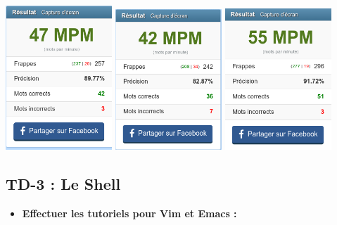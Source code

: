 \documentclass[12pt]{article}
\begin{document}
\thispagestyle{empty}
\begin{center}
  \includegraphics[width=4cm]{images/screen-resultat-1.png}\hfill
  \includegraphics[width=4cm]{images/screen-resultat-2.png}\hfill
  \includegraphics[width=4cm]{images/screen-resultat-3.png}
\end{center}
\vspace{0.3cm}

	\subsection{TD-3 : Le Shell}
  \vspace{0.3cm}

\begin{itemize}
  \item \textbf{Effectuer les tutoriels pour Vim et Emacs :}
\end{itemize}
\vspace{0.3cm}
\end{document}

